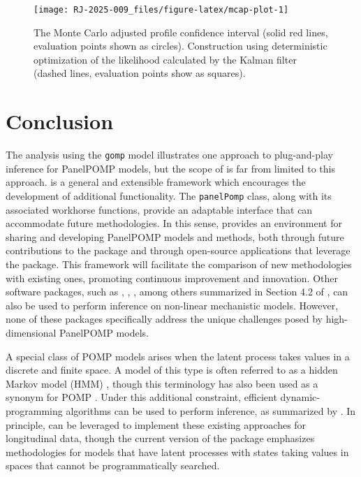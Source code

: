 \begin{figure}

{\centering \texttt{[image: RJ-2025-009\_files/figure-latex/mcap-plot-1]} 

}

\caption{The Monte Carlo adjusted profile confidence interval (solid red lines, evaluation points shown as circles). Construction using deterministic optimization of the likelihood calculated by the Kalman filter (dashed lines, evaluation points show as squares).}\label{fig:mcap-plot}
\end{figure}

\section{Conclusion}\label{conclusion}

The analysis using the \texttt{gomp} model illustrates one approach to plug-and-play inference for PanelPOMP models, but the scope of  is far from limited to this approach.
 is a general and extensible framework which encourages the development of additional functionality.
The \texttt{panelPomp} class, along with its associated workhorse functions, provide an adaptable interface that can accommodate future methodologies.
In this sense,  provides an environment for sharing and developing PanelPOMP models and methods, both through future contributions to the  package and through open-source applications that leverage the package.
This framework will facilitate the comparison of new methodologies with existing ones, promoting continuous improvement and innovation.
Other software packages, such as , , , among others summarized in Section 4.2 of \citet{newman23}, can also be used to perform inference on non-linear mechanistic models.
However, none of these packages specifically address the unique challenges posed by high-dimensional PanelPOMP models.

A special class of POMP models arises when the latent process takes values in a discrete and finite space.
A model of this type is often referred to as a hidden Markov model (HMM) \citep{eddy04, doucet01, glennie23, newman23}, though this terminology has also been used as a synonym for POMP \citep{king16}.
Under this additional constraint, efficient dynamic-programming algorithms can be used to perform inference, as summarized by \citet{mcclintock20}.
In principle,  can be leveraged to implement these existing approaches for longitudinal data, though the current version of the package emphasizes methodologies for models that have latent processes with states taking values in spaces that cannot be programmatically searched.

